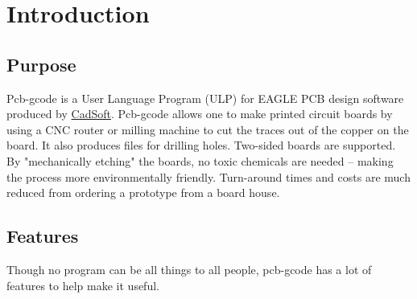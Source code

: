 \documentclass[11pt]{book}
\begin{document}
\tableofcontents

\listoffigures

\listoftables

\mainmatter

%
\chapter{Introduction}\label{chp:Introduction}
%

%
%
\section{Purpose}\label{sec:Purpose}

Pcb-gcode is a User Language Program (ULP) for EAGLE PCB design software produced by \href{http://cadsoftusa.com}{CadSoft}. Pcb-gcode allows one to make printed circuit boards by using a CNC router or milling machine to cut the traces out of the copper on the board. It also produces files for drilling holes. Two-sided boards are supported. By "mechanically etching" the boards, no toxic chemicals are needed -- making the process more environmentally friendly. Turn-around times and costs are much reduced from ordering a prototype from a board house.

%
%
\section{Features}\label{sec:Features}

Though no program can be all things to all people, pcb-gcode has a lot of features to help make it useful.
\end{document}
